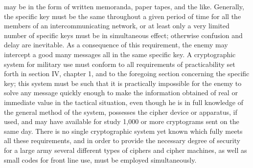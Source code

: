 may be in the form of written memoranda, paper tapes, and the like.
Generally, the speciﬁc key must be the same throughout a given period
of time for all the members of an intercommunicating network, or at
least only a very limited number of speciﬁc keys must be in simultaneous
effect; otherwise confusion and delay are inevitable. As a consequence
of this requirement, the enemy may intercept a good many messages all
in the same speciﬁc key. A cryptographic system for military use must
conform to all requirements of practicability set forth in section IV,
chapter 1, and to the foregoing section concerning the speciﬁc key; this
system must be such that it is practically impossible for the enemy to
solve any message quickly enough to make the information obtained of
real or immediate value in the tactical situation, even though he is in full
knowledge of the general method of the system, possesses the cipher
device or apparatus, if used, and may have available for study 1,000 or
more cryptograms sent on the same day. There is no single cryptographic
system yet known which fully meets all these requirements, and in order
to provide the necessary degree of security for a large army several
different types of ciphers and cipher machines, as well as small codes
for front line use, must be employed simultaneously.
